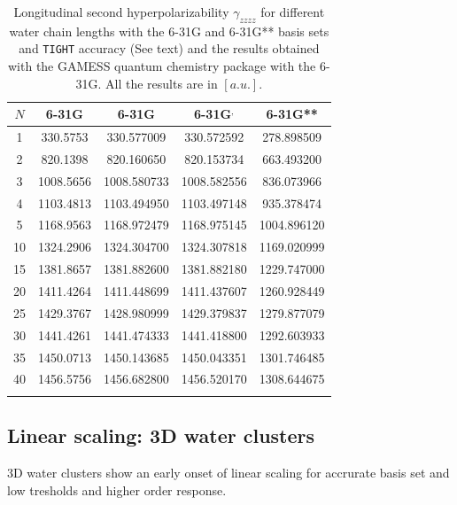 \documentclass[prl,aps,twocolumn,showpacs,twocolumngrid,superbib]{revtex4}
\begin{document}
\begin{table}
  \centering
  \caption{\protect
    Longitudinal second hyperpolarizability $\gamma_{zzzz}$
    for different water chain lengths with the 6-31G and 6-31G** basis sets
    and {\tt TIGHT} accuracy (See text) and the results obtained with
    the GAMESS quantum chemistry package \cite{gamess} with the 6-31G. 
    All the results are in $[a.u.]$.
  }\label{tab:Gamma_1D_Values}
  \begin{tabular}{ccccc}
    \toprule
    $N$ &\multicolumn{1}{c}{6-31G\footnotemark[1]}
    &\multicolumn{1}{c}{6-31G\footnotemark[2]}
    &\multicolumn{1}{c}{6-31G\footnotemark[2]$^,$\footnotemark[3]}
    &\multicolumn{1}{c}{6-31G**\footnotemark[2]}\\
    \hline
     1 &  330.5753 &  330.577009 &  330.572592 &  278.898509 \\
     2 &  820.1398 &  820.160650 &  820.153734 &  663.493200 \\
     3 & 1008.5656 & 1008.580733 & 1008.582556 &  836.073966 \\
     4 & 1103.4813 & 1103.494950 & 1103.497148 &  935.378474 \\
     5 & 1168.9563 & 1168.972479 & 1168.975145 & 1004.896120 \\
    10 & 1324.2906 & 1324.304700 & 1324.307818 & 1169.020999 \\
    15 & 1381.8657 & 1381.882600 & 1381.882180 & 1229.747000 \\
    20 & 1411.4264 & 1411.448699 & 1411.437607 & 1260.928449 \\
    25 & 1429.3767 & 1428.980999 & 1429.379837 & 1279.877079 \\
    30 & 1441.4261 & 1441.474333 & 1441.418800 & 1292.603933 \\
    35 & 1450.0713 & 1450.143685 & 1450.043351 & 1301.746485 \\
    40 & 1456.5756 & 1456.682800 & 1456.520170 & 1308.644675 \\
    \botrule
  \end{tabular}
\end{table}


\subsection{Linear scaling: 3D water clusters}
3D water clusters show an early onset of linear scaling for accrurate
basis set and low tresholds and higher order response.
\end{document}
